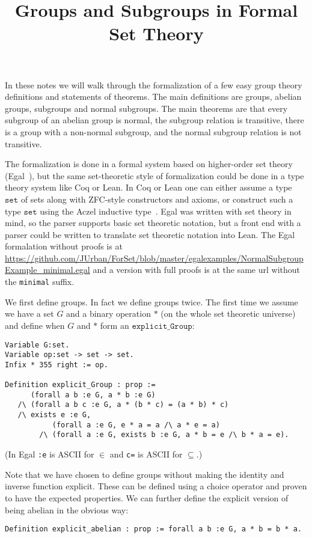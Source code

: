 \documentclass{article}
\title{Groups and Subgroups in Formal Set Theory}
\begin{document}
\maketitle

In these notes we will walk through the formalization of a few easy
group theory definitions and statements of theorems.  The main
definitions are groups, abelian groups, subgroups and normal
subgroups.  The main theorems are that every subgroup of an abelian
group is normal, the subgroup relation is transitive, there is a group
with a non-normal subgroup, and the normal subgroup relation is not
transitive.

The formalization is done in a formal system based on higher-order set theory (Egal~\cite{BrownPak2019}),
but the same set-theoretic style of formalization could be done in a type theory system like Coq or Lean.
In Coq or Lean one can either assume a type ${\mathtt{set}}$ of sets along with ZFC-style constructors
and axioms, or construct such a type ${\mathtt{set}}$ using the Aczel inductive type~\cite{Aczel98}.
Egal was written with set theory in mind, so the parser supports basic set theoretic notation,
but a front end with a parser could be written to translate set theoretic notation into Lean.
The Egal formalation without proofs is at\\
\url{https://github.com/JUrban/ForSet/blob/master/egalexamples/NormalSubgroupExample_minimal.egal}
and a version with full proofs is at the same url without the {\tt{minimal}} suffix.

We first define groups. In fact we define groups twice.
The first time we assume we have a set $G$ and a binary operation $*$ (on the whole set theoretic universe)
and define when $G$ and $*$ form an ${\mathtt{explicit\_Group}}$:
\begin{verbatim}
Variable G:set.
Variable op:set -> set -> set.
Infix * 355 right := op.

Definition explicit_Group : prop :=
      (forall a b :e G, a * b :e G)
   /\ (forall a b c :e G, a * (b * c) = (a * b) * c)
   /\ exists e :e G,
           (forall a :e G, e * a = a /\ a * e = a)
        /\ (forall a :e G, exists b :e G, a * b = e /\ b * a = e).
\end{verbatim}
(In Egal \verb+:e+ is ASCII for $\in$ and \verb+c=+ is ASCII for $\subseteq$.)

Note that we have chosen to define groups without making the identity
and inverse function explicit. These can be defined using a choice operator
and proven to have the expected properties.
We can further define the explicit version of being abelian in the obvious way:
\begin{verbatim}
Definition explicit_abelian : prop := forall a b :e G, a * b = b * a.
\end{verbatim}
\end{document}
